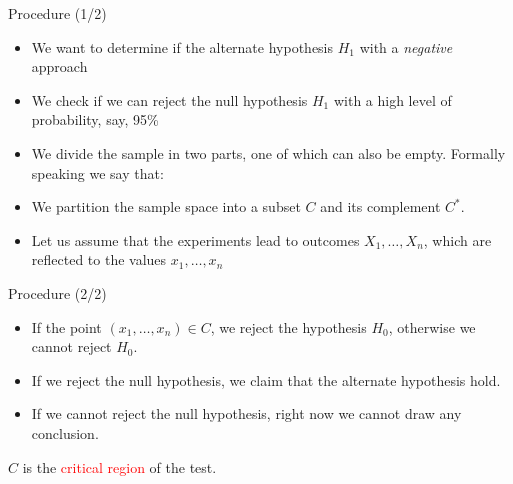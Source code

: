\documentclass{beamer}
\begin{document}

\begin{frame}
{\centerline{Procedure (1/2)}}

\begin{itemize}
\item We want to determine if the  alternate hypothesis $H_1$ with a \textit{negative} approach
\item We check if we can reject the null hypothesis $H_1$ with a high level of probability, say, 95\%
\item We divide the sample in two parts, one of which can also be empty. Formally speaking we say that:
\item We  partition the sample space into a subset $C$ and its complement $C^*$.
\item Let us assume that the experiments lead to outcomes  $X_1,\ldots, X_n$, which are reflected to the values $x_1,\ldots, x_n$
\end{itemize}


\end{frame}

\begin{frame}
{\centerline{Procedure (2/2)}}

\begin{itemize}
\item If the point $(x_1,\ldots, x_n) \in C$, we reject the hypothesis $H_0$, otherwise we cannot reject $H_0$. 
\item If we reject the null hypothesis, we claim that the alternate hypothesis hold.
\item If we cannot reject the null hypothesis, right now we cannot draw any conclusion.
\end{itemize}

\vspace*{1cm}
\begin{center}
$C$ is the \textcolor{red}{critical region} of the test.
\end{center}

\end{frame}


\end{document}
